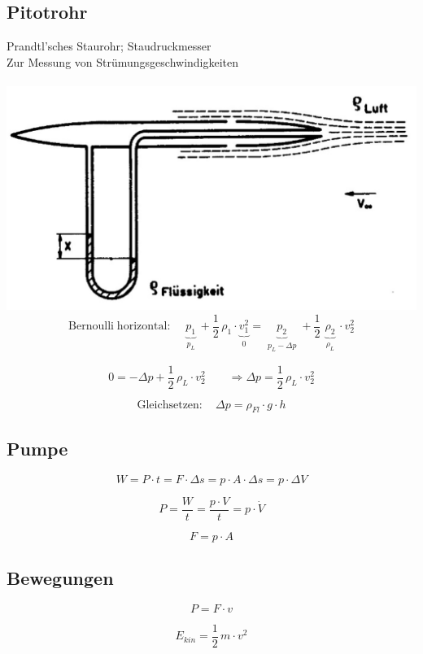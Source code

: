 \subsection{Pitotrohr}
Prandtl'sches Staurohr; Staudruckmesser \\
Zur Messung von Strümungsgeschwindigkeiten \\
\\
\includegraphics[width=0.73\linewidth]{Bilder/pitotrohr} \\

$$ \mathrm{Bernoulli \; horizontal:} \quad \boxed{  \underbrace{p_1}_{\substack{p_L}} + \frac{1}{2} \, \rho_1 \cdot \underbrace{v_1^2}_{\substack{0}} =  \underbrace{p_2}_{\substack{p_L - \Delta p}} + \frac{1}{2} \, \underbrace{\rho_2}_{\substack{\rho_L}} \cdot v_2^2} $$

$$ 0 = - \Delta p + \frac{1}{2} \, \rho_L \cdot v_2^2 \qquad \Rightarrow \Delta p =\frac{1}{2} \, \rho_L \cdot v_2^2 $$

$$ \mathrm{Gleichsetzen: } \quad \Delta p = \rho_{Fl} \cdot g \cdot h$$


\subsection{Pumpe}
$$ \boxed{ W = P \cdot t = F \cdot \Delta s = p \cdot A \cdot \Delta s = p \cdot \Delta V }  $$

$$ \boxed{ P =  \frac{W}{t} = \frac{p \cdot V}{t} = p  \cdot  \dot{V} } $$

$$ \boxed{ F = p \cdot A } $$

\vfill\null
\columnbreak


\subsection{Bewegungen}

$$ \boxed{ P = F \cdot v } $$

$$ \boxed{ E_{kin} = \frac{1}{2} \, m \cdot v^2 } $$


